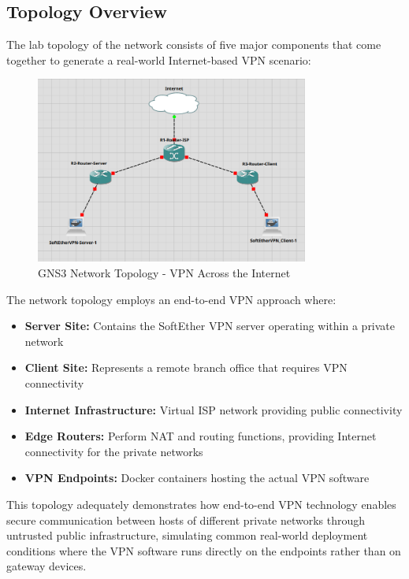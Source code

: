 \subsection{Topology Overview}

The lab topology of the network consists of five major components that come together to generate a real-world Internet-based VPN scenario:

\begin{figure}[H]
\centering
\includegraphics[width=0.8\textwidth]{../resources/Images/GNS3_Structure.png}
\caption{GNS3 Network Topology - VPN Across the Internet}
\label{fig:gns3_topology}
\end{figure}

The network topology employs an end-to-end VPN approach where:

\begin{itemize}
    \item \textbf{Server Site:} Contains the SoftEther VPN server operating within a private network
    \item \textbf{Client Site:} Represents a remote branch office that requires VPN connectivity
    \item \textbf{Internet Infrastructure:} Virtual ISP network providing public connectivity
    \item \textbf{Edge Routers:} Perform NAT and routing functions, providing Internet connectivity for the private networks
    \item \textbf{VPN Endpoints:} Docker containers hosting the actual VPN software 
\end{itemize}

This topology adequately demonstrates how end-to-end VPN technology enables secure communication between hosts of different private networks through untrusted public infrastructure, simulating common real-world deployment conditions where the VPN software runs directly on the endpoints rather than on gateway devices.

